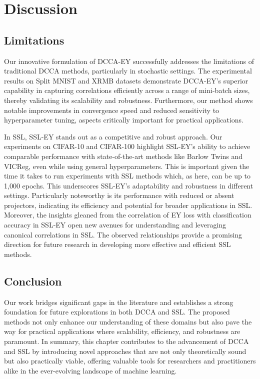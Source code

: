 \section{Discussion}

\subsection{Limitations}

Our innovative formulation of DCCA-EY successfully addresses the limitations of traditional DCCA methods, particularly in stochastic settings.
The experimental results on Split MNIST and XRMB datasets demonstrate DCCA-EY's superior capability in capturing correlations efficiently across a range of mini-batch sizes, thereby validating its scalability and robustness.
Furthermore, our method shows notable improvements in convergence speed and reduced sensitivity to hyperparameter tuning, aspects critically important for practical applications.

In SSL, SSL-EY stands out as a competitive and robust approach.
Our experiments on CIFAR-10 and CIFAR-100 highlight SSL-EY's ability to achieve comparable performance with state-of-the-art methods like Barlow Twins and VICReg, even while using general hyperparameters.
This is important given the time it takes to run experiments with SSL methods which, as here, can be up to 1,000 epochs.
This underscores SSL-EY's adaptability and robustness in different settings.
Particularly noteworthy is its performance with reduced or absent projectors, indicating its efficiency and potential for broader applications in SSL\@.
Moreover, the insights gleaned from the correlation of EY loss with classification accuracy in SSL-EY open new avenues for understanding and leveraging canonical correlations in SSL. The observed relationships provide a promising direction for future research in developing more effective and efficient SSL methods.

\subsection{Conclusion}

Our work bridges significant gaps in the literature and establishes a strong foundation for future explorations in both DCCA and SSL. The proposed methods not only enhance our understanding of these domains but also pave the way for practical applications where scalability, efficiency, and robustness are paramount.
In summary, this chapter contributes to the advancement of DCCA and SSL by introducing novel approaches that are not only theoretically sound but also practically viable, offering valuable tools for researchers and practitioners alike in the ever-evolving landscape of machine learning.